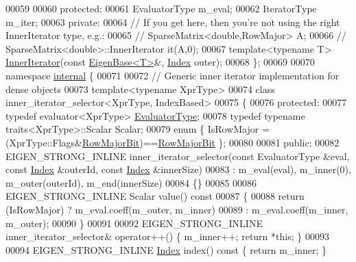 \begin{DoxyCode}
00059   
00060 \textcolor{keyword}{protected}:
00061   EvaluatorType m\_eval;
00062   IteratorType m\_iter;
00063 \textcolor{keyword}{private}:
00064   \textcolor{comment}{// If you get here, then you're not using the right InnerIterator type, e.g.:}
00065   \textcolor{comment}{//   SparseMatrix<double,RowMajor> A;}
00066   \textcolor{comment}{//   SparseMatrix<double>::InnerIterator it(A,0);}
00067   \textcolor{keyword}{template}<\textcolor{keyword}{typename} T> \hyperlink{class_eigen_1_1_inner_iterator}{InnerIterator}(\textcolor{keyword}{const} \hyperlink{group___core___module_struct_eigen_1_1_eigen_base}{EigenBase<T>}&,
      \hyperlink{namespace_eigen_a62e77e0933482dafde8fe197d9a2cfde}{Index} outer);
00068 \};
00069 
00070 \textcolor{keyword}{namespace }\hyperlink{namespaceinternal}{internal} \{
00071 
00072 \textcolor{comment}{// Generic inner iterator implementation for dense objects}
00073 \textcolor{keyword}{template}<\textcolor{keyword}{typename} XprType>
00074 \textcolor{keyword}{class }inner\_iterator\_selector<XprType, IndexBased>
00075 \{
00076 \textcolor{keyword}{protected}:
00077   \textcolor{keyword}{typedef} evaluator<XprType> \hyperlink{struct_eigen_1_1internal_1_1evaluator}{EvaluatorType};
00078   \textcolor{keyword}{typedef} \textcolor{keyword}{typename} traits<XprType>::Scalar Scalar;
00079   \textcolor{keyword}{enum} \{ IsRowMajor = (XprType::Flags&\hyperlink{group__flags_gae4f56c2a60bbe4bd2e44c5b19cbe8762}{RowMajorBit})==\hyperlink{group__flags_gae4f56c2a60bbe4bd2e44c5b19cbe8762}{RowMajorBit} \};
00080   
00081 \textcolor{keyword}{public}:
00082   EIGEN\_STRONG\_INLINE inner\_iterator\_selector(\textcolor{keyword}{const} EvaluatorType &eval, \textcolor{keyword}{const} 
      \hyperlink{namespace_eigen_a62e77e0933482dafde8fe197d9a2cfde}{Index} &outerId, \textcolor{keyword}{const} \hyperlink{namespace_eigen_a62e77e0933482dafde8fe197d9a2cfde}{Index} &innerSize)
00083     : m\_eval(eval), m\_inner(0), m\_outer(outerId), m\_end(innerSize)
00084   \{\}
00085 
00086   EIGEN\_STRONG\_INLINE Scalar value()\textcolor{keyword}{ const}
00087 \textcolor{keyword}{  }\{
00088     \textcolor{keywordflow}{return} (IsRowMajor) ? m\_eval.coeff(m\_outer, m\_inner)
00089                         : m\_eval.coeff(m\_inner, m\_outer);
00090   \}
00091 
00092   EIGEN\_STRONG\_INLINE inner\_iterator\_selector& operator++() \{ m\_inner++; \textcolor{keywordflow}{return} *\textcolor{keyword}{this}; \}
00093 
00094   EIGEN\_STRONG\_INLINE \hyperlink{namespace_eigen_a62e77e0933482dafde8fe197d9a2cfde}{Index} index()\textcolor{keyword}{ const }\{ \textcolor{keywordflow}{return} m\_inner; \}

\end{DoxyCode}
